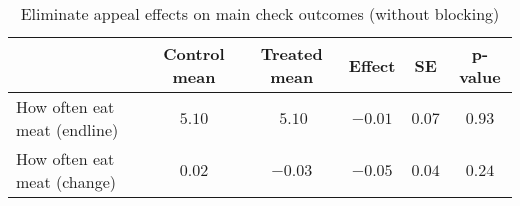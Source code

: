 \begin{table*}[ht]
\caption{Eliminate appeal effects on main check outcomes (without blocking)\label{round}} 
\begin{center}
\begin{tabular}{lccccc}
\hline\hline
\multicolumn{1}{l}{}&\multicolumn{1}{c}{Control mean}&\multicolumn{1}{c}{Treated mean}&\multicolumn{1}{c}{Effect}&\multicolumn{1}{c}{SE}&\multicolumn{1}{c}{p-value}\tabularnewline
\hline
How often eat meat (endline)&$5.10$&$~5.10$&$-0.01$&$0.07$&$0.93$\tabularnewline
How often eat meat (change)&$0.02$&$-0.03$&$-0.05$&$0.04$&$0.24$\tabularnewline
\hline
\end{tabular}\end{center}

\end{table*}
